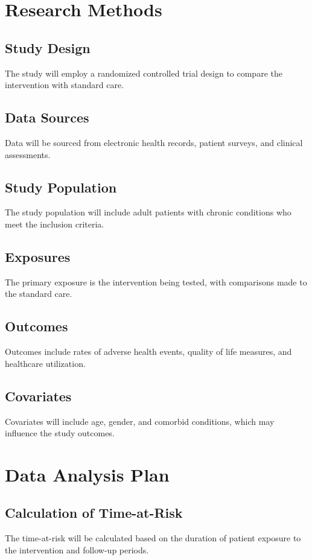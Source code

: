 \documentclass[12pt]{article}
\begin{document}
\section{Research Methods}
\label{research-methods}

\subsection{Study Design}
The study will employ a randomized controlled trial design to compare the intervention with standard care.

\subsection{Data Sources}
Data will be sourced from electronic health records, patient surveys, and clinical assessments.

\subsection{Study Population}
The study population will include adult patients with chronic conditions who meet the inclusion criteria.

\subsection{Exposures}
The primary exposure is the intervention being tested, with comparisons made to the standard care.

\subsection{Outcomes}
Outcomes include rates of adverse health events, quality of life measures, and healthcare utilization.

\subsection{Covariates}
Covariates will include age, gender, and comorbid conditions, which may influence the study outcomes.

\section{Data Analysis Plan}
\label{data-analysis-plan}

\subsection{Calculation of Time-at-Risk}
The time-at-risk will be calculated based on the duration of patient exposure to the intervention and follow-up periods.
\end{document}
